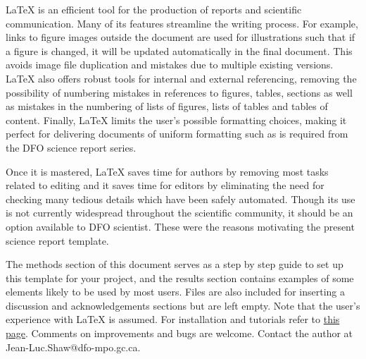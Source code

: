 %
%
\clearpage
{} %
%
%
%

LaTeX is an efficient tool for the production of reports and scientific communication. Many of its features streamline the writing process. For example, links to figure images outside the document are used for illustrations such that if a figure is changed, it will be updated automatically in the final document. This avoids image file duplication and mistakes due to multiple existing versions. LaTeX also offers robust tools for internal and external referencing, removing the possibility of numbering mistakes in references to figures, tables, sections as well as mistakes in the numbering of lists of figures, lists of tables and tables of content. Finally, LaTeX limits the user's possible formatting choices, making it perfect for delivering documents of uniform formatting such as is required from the DFO science report series.

Once it is mastered, LaTeX saves time for authors by removing most tasks related to editing and it saves time for editors by eliminating the need for checking many tedious details which have been safely automated. Though its use is not currently widespread throughout the scientific community, it should be an option available to DFO scientist. These were the reasons motivating the present science report template.

The methods section of this document serves as a step by step guide to set up this template for your project, and the results section contains examples of some elements likely to be used by most users. Files are also included for inserting a discussion and acknowledgements sections but are left empty. Note that the user's experience with LaTeX is assumed. For installation and tutorials refer to \href{http://tug.org/}{this page}. Comments on improvements and bugs are welcome. Contact the author at Jean-Luc.Shaw@dfo-mpo.gc.ca.
